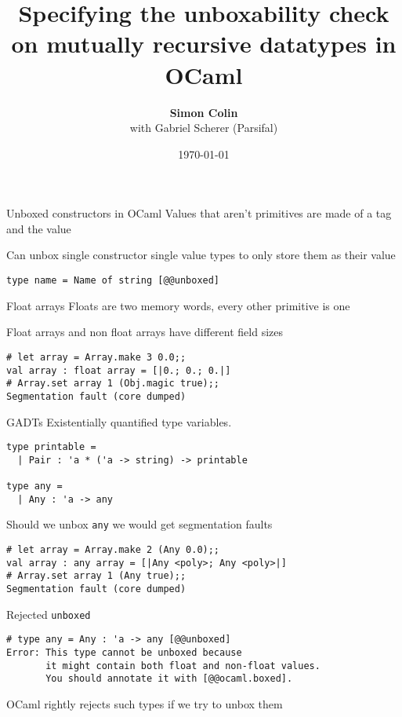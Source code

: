\documentclass[svgnames,colorlinks]{beamer}
\title{Specifying the unboxability check on mutually recursive datatypes in OCaml}
\author{\textbf{Simon Colin}\\
with Gabriel Scherer (Parsifal)}
\date{\today}
\begin{document}
\begin{frame}
  \titlepage
\end{frame}

\begin{frame}[fragile]{Unboxed constructors in OCaml}
Values that aren't primitives are made of a tag and the value
	
\vfill
	
Can unbox single constructor single value types to only store them as their value

\vfill
  
\begin{lstlisting}
type name = Name of string [@@unboxed]
\end{lstlisting}
\end{frame}

\begin{frame}[fragile]{Float arrays}
Floats are two memory words, every other primitive is one
	
\vfill
	
Float arrays and non float arrays have different field sizes

\vfill

\begin{lstlisting}
# let array = Array.make 3 0.0;;
val array : float array = [|0.; 0.; 0.|]
# Array.set array 1 (Obj.magic true);;
Segmentation fault (core dumped)
\end{lstlisting}
\end{frame}

\begin{frame}[fragile]{GADTs}
Existentially quantified type variables.

\vfill

\begin{lstlisting}
type printable =
  | Pair : 'a * ('a -> string) -> printable

type any =
  | Any : 'a -> any
\end{lstlisting}

\vfill

Should we unbox \texttt{any} we would get segmentation faults

\begin{lstlisting}
# let array = Array.make 2 (Any 0.0);;
val array : any array = [|Any <poly>; Any <poly>|]
# Array.set array 1 (Any true);;
Segmentation fault (core dumped)
\end{lstlisting}
\end{frame}

\begin{frame}[fragile]{Rejected \texttt{unboxed}}
\begin{lstlisting}
# type any = Any : 'a -> any [@@unboxed]
Error: This type cannot be unboxed because
       it might contain both float and non-float values.
       You should annotate it with [@@ocaml.boxed].
\end{lstlisting}
	\vfill

	OCaml rightly rejects such types if we try to unbox them
\end{frame}
\end{document}
